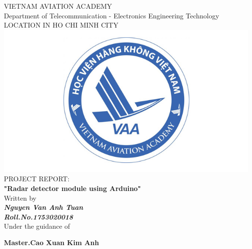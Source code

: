 \documentclass[a4paper,13pt]{report}
\begin{document}
    \centering
    \LARGE{\textsc{VIETNAM AVIATION ACADEMY}}\\
    \vspace{3mm}
    \normalsize{Department of Telecommunication - Electronics Engineering Technology} \\
    \vspace{3mm}
    \large{LOCATION IN HO CHI MINH CITY} \\
    \vspace{3mm}
    \includegraphics[scale=0.3]{logo.jpg} \\
    \vspace{3mm}
    \normalsize{PROJECT REPORT: } \\ 
    \vspace{15mm}
    \huge{\textbf{"Radar detector module using Arduino"}} \\
    \vspace{20mm}
    \normalsize{Written by} \\
    \vspace{3mm}
    \large{\textbf{\textit{Nguyen Van Anh Tuan}}} \\
    \vspace{3mm}
    \textbf{{\large{\textit{Roll.No.1753020018}}}} \\
    \vspace{15mm}
    \large{Under the guidance of} \\ 
    \vspace{10mm}
    \centerline{\textbf{\large{Master.Cao Xuan Kim Anh}}}
    
    \pagestyle{fancy}
    \fancyhf{}
    \cfoot{\today}
    \renewcommand{\headrulewidth}{2pt}
    \renewcommand{\footrulewidth}{1pt}
\end{document}
